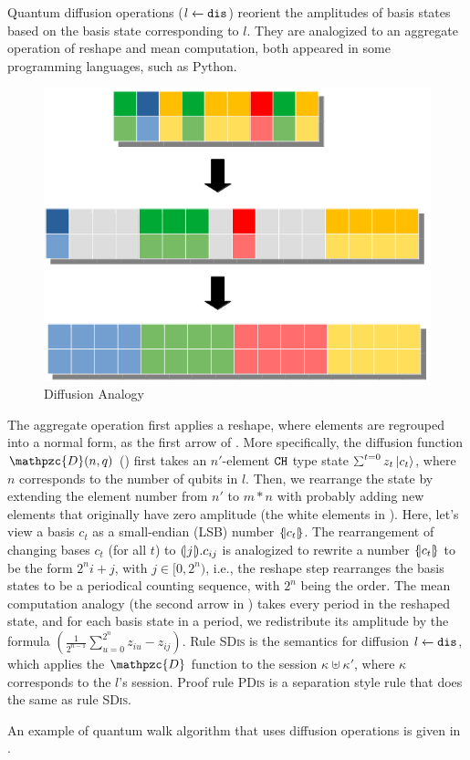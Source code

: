 \label{sec:diffuse}
Quantum diffusion operations (${l} \xleftarrow{} {\texttt{dis}}$) reorient the amplitudes of basis states based on the basis state corresponding to $l$. They are analogized to an aggregate operation of reshape and mean computation, both appeared in some programming languages, such as Python.
%
\begin{figure}
  \includegraphics[width=.36\textwidth]{diffuse}
  \caption{Diffusion Analogy}
\label{fig:qafny-dis-analog}
\end{figure}
%
The aggregate operation first applies a reshape, where elements are regrouped into a normal form, as the first arrow of . More specifically, the diffusion function $\mathpzc{D}(n,q)$ () first takes an $n'$-element $\texttt{CH}$ type state $\schi{t=0}{z_t}{c_t}$, where $n$ corresponds to the number of qubits in $l$.
Then, we rearrange the state by extending the element number from $n'$ to $m*n$ with probably adding new elements that originally have zero amplitude (the white elements in ).
Here, let's view a basis $c_{t}$ as a small-endian (LSB) number $\{\hspace{-0.2em}| c_{t} |\hspace{-0.2em}\}$. The rearrangement of changing bases $c_{t}$ (for all $t$) to $(\!| j |\!).c_{ij}$ is analogized to rewrite a number $\{\hspace{-0.2em}| c_{t} |\hspace{-0.2em}\}$ to be the form $2^n i+j$, with $j\in [0,2^n)$,
i.e., the reshape step rearranges the basis states to be a periodical counting sequence, with $2^n$ being the order.
The mean computation analogy (the second arrow in ) takes every period in the reshaped state, and for each basis state in a period, we redistribute its amplitude by the formula $(\frac{1}{2^{n-1}}\sum_{u=0}^{2^n}z_{iu} - z_{ij})$.
Rule \textsc{SDis} is the semantics for diffusion ${l} \xleftarrow{} {\texttt{dis}}$, which applies the $\mathpzc{D}$ function to the session $\kappa \uplus \kappa'$, where $\kappa$ corresponds to the $l$'s session. Proof rule \textsc{PDis} is a separation style rule that does the same as rule \textsc{SDis}.
An example of quantum walk algorithm that uses diffusion operations is given in .

